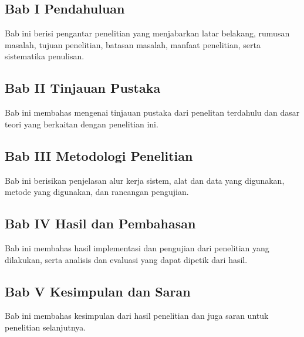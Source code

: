 \subsection{Bab I Pendahuluan}
Bab ini berisi pengantar penelitian yang menjabarkan latar belakang, rumusan masalah, tujuan penelitian, batasan masalah, manfaat penelitian, serta sistematika penulisan. \par

\subsection{Bab II Tinjauan Pustaka}
Bab ini membahas mengenai tinjauan pustaka dari penelitan terdahulu dan dasar teori yang berkaitan dengan penelitian ini.

\subsection{Bab III Metodologi Penelitian}
Bab ini berisikan penjelasan alur kerja sistem, alat dan data yang digunakan, metode yang digunakan, dan rancangan pengujian.

\subsection{Bab IV Hasil dan Pembahasan}
Bab ini membahas hasil implementasi dan pengujian dari penelitian yang dilakukan, serta analisis dan evaluasi yang dapat dipetik dari hasil.

\subsection{Bab V Kesimpulan dan Saran}
Bab ini membahas kesimpulan dari hasil penelitian dan juga saran untuk penelitian selanjutnya.